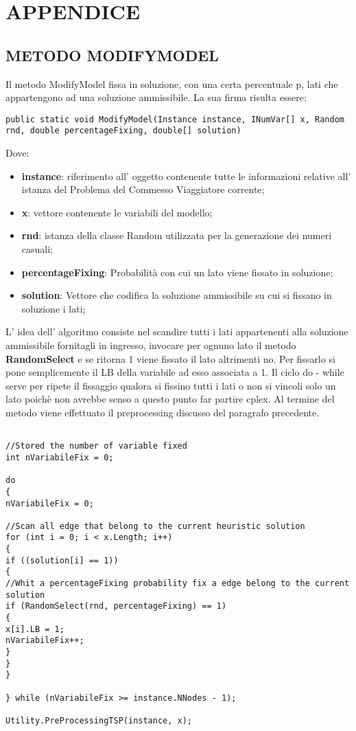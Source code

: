 \documentclass[11pt]{article}
\begin{document}
\section*{APPENDICE}
\label{sec:AppendiceS}

\subsection*{METODO MODIFYMODEL}
\label{sec:ModifyModelS}

Il metodo ModifyModel fissa in soluzione, con una certa percentuale p, lati che appartengono ad una soluzione ammissibile. La sua firma risulta essere:

\begin{lstlisting} 
public static void ModifyModel(Instance instance, INumVar[] x, Random rnd, double percentageFixing, double[] solution)
\end{lstlisting}

Dove:

\begin{itemize}
    \item \textbf{instance}: riferimento all' oggetto contenente tutte le informazioni relative all' istanza del Problema del Commesso Viaggiatore corrente;
    \item \textbf{x}: vettore contenente le variabili del modello;
    \item \textbf{rnd}: istanza della classe Random utilizzata per la generazione dei numeri casuali;
    \item \textbf{percentageFixing}: Probabilità con cui un lato viene fissato in soluzione;
    \item \textbf{solution}: Vettore che codifica la soluzione ammissibile su cui si fissano in soluzione i lati;
\end{itemize}

L' idea dell' algoritmo consiste nel scandire tutti i lati appartenenti alla soluzione ammissibile fornitagli in ingresso, invocare per ognuno lato il metodo \textbf{RandomSelect} e se ritorna 1 viene fissato il lato altrimenti no. Per fissarlo si pone semplicemente il LB della variabile ad esso associata a 1.  Il ciclo do - while serve per ripete il fissaggio qualora si fissino tutti i lati o non si vincoli solo un lato poichè non avrebbe senso a questo punto far partire cplex. Al termine del metodo viene effettuato il preprocessing discusso del paragrafo precedente.

\begin{lstlisting}

//Stored the number of variable fixed
int nVariabileFix = 0;

do
{
nVariabileFix = 0;

//Scan all edge that belong to the current heuristic solution
for (int i = 0; i < x.Length; i++)
{
if ((solution[i] == 1))
{
//Whit a percentageFixing probability fix a edge belong to the current solution
if (RandomSelect(rnd, percentageFixing) == 1)
{
x[i].LB = 1;
nVariabileFix++;
}
}
}

} while (nVariabileFix >= instance.NNodes - 1);

Utility.PreProcessingTSP(instance, x);

\end{lstlisting}
\end{document}
